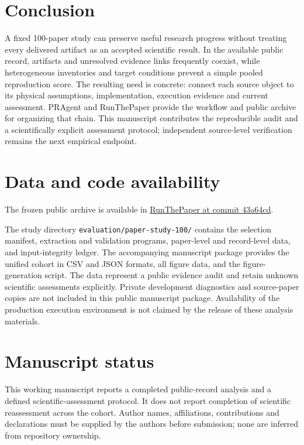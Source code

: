\documentclass[10pt,a4paper]{article}
\begin{document}
\section{Conclusion}\label{conclusion}

A fixed 100-paper study can preserve useful research progress without
treating every delivered artifact as an accepted scientific result. In
the available public record, artifacts and unresolved evidence links
frequently coexist, while heterogeneous inventories and target
conditions prevent a simple pooled reproduction score. The resulting
need is concrete: connect each source object to its physical
assumptions, implementation, execution evidence and current assessment.
PRAgent and RunThePaper provide the workflow and public archive for
organizing that chain. This manuscript contributes the reproducible
audit and a scientifically explicit assessment protocol; independent
source-level verification remains the next empirical endpoint.

\section*{Data and code availability}\label{data-and-code-availability}

The frozen public archive is available in
\href{https://github.com/xi-zhao/RunThePaper/tree/43a64cd03824edb136b549f352412e8d263d9361}{RunThePaper
at commit 43a64cd}.

The study directory \texttt{evaluation/paper-study-100/} contains the
selection manifest, extraction and validation programs, paper-level and
record-level data, and input-integrity ledger. The accompanying
manuscript package provides the unified cohort in CSV and JSON formats,
all figure data, and the figure-generation script. The data represent a
public evidence audit and retain unknown scientific assessments
explicitly. Private development diagnostics and source-paper copies are
not included in this public manuscript package. Availability of the
production execution environment is not claimed by the release of these
analysis materials.

\section*{Manuscript status}\label{manuscript-status}

This working manuscript reports a completed public-record analysis and a
defined scientific-assessment protocol. It does not report completion of
scientific reassessment across the cohort. Author names, affiliations,
contributions and declarations must be supplied by the authors before
submission; none are inferred from repository ownership.
\end{document}

